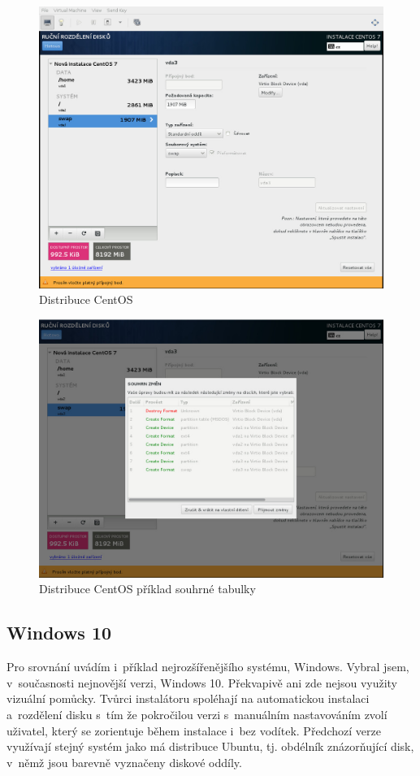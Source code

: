 \documentclass{report}
\begin{document}
\begin{figure}[hb]
\label{fig:centos1}
\caption{Distribuce CentOS}
\centering
\includegraphics[width=.8\columnwidth]{pics/centos1.jpg}
\end{figure}

\begin{figure}[hb]
\label{fig:centos2}
\caption{Distribuce CentOS příklad souhrné tabulky}
\centering
\includegraphics[width=.8\columnwidth]{pics/centos3.jpg}
\end{figure}

\subsection{Windows 10}

Pro srovnání uvádím i~příklad nejrozšířenějšího systému, Windows. Vybral jsem, v~současnosti nejnovější verzi, Windows 10. Překvapivě ani zde nejsou využity vizuální pomůcky.
Tvůrci instalátoru spoléhají na automatickou instalaci a~rozdělení disku s~tím že pokročilou verzi s~manuálním nastavováním zvolí uživatel, který se zorientuje během instalace i~bez vodítek. Předchozí verze využívají stejný systém jako má distribuce Ubuntu, tj. obdélník znázorňující disk, v~němž jsou barevně vyznačeny diskové oddíly.
\end{document}
